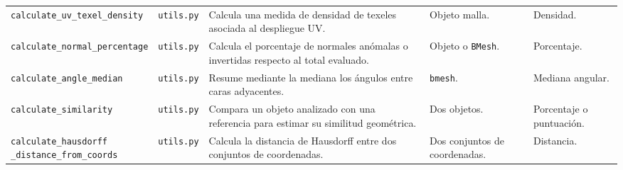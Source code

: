 {\begin{landscape}
\begin{longtable}{p{4.7cm}p{3.2cm}p{8.5cm}p{3.8cm}p{3.8cm}}
\texttt{calculate\_uv\_texel\_density} & \texttt{utils.py} & Calcula una medida de densidad de texeles asociada al despliegue UV. & Objeto malla. & Densidad. \\
\texttt{calculate\_normal\_percentage} & \texttt{utils.py} & Calcula el porcentaje de normales anómalas o invertidas respecto al total evaluado. & Objeto o \texttt{BMesh}. & Porcentaje. \\
\texttt{calculate\_angle\_median} & \texttt{utils.py} & Resume mediante la mediana los ángulos entre caras adyacentes. & \texttt{bmesh}. & Mediana angular. \\
\texttt{calculate\_similarity} & \texttt{utils.py} & Compara un objeto analizado con una referencia para estimar su similitud geométrica. & Dos objetos. & Porcentaje o puntuación. \\
\shortstack[l]{\texttt{calculate\_hausdorff}\\\texttt{\_distance\_from\_coords}} & \texttt{utils.py} & Calcula la distancia de Hausdorff entre dos conjuntos de coordenadas. & Dos conjuntos de coordenadas. & Distancia. \\
\end{longtable}
\endgroup
\end{landscape}
}

